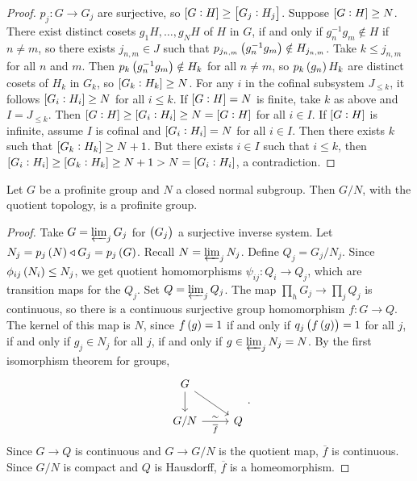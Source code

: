 \begin{proof}
$ p_j : G \to G_j $ are surjective, so $ \sbr{G : H} \ge \sbr{G_j : H_j} $. Suppose $ \sbr{G : H} \ge N $. There exist distinct cosets $ g_1H, \dots, g_NH $ of $ H $ in $ G $, if and only if $ g_n^{-1}g_m \notin H $ if $ n \ne m $, so there exists $ j_{n, m} \in J $ such that $ p_{j_{n, m}}\br{g_n^{-1}g_m} \notin H_{j_{n, m}} $. Take $ k \le j_{n, m} $ for all $ n $ and $ m $. Then $ p_k\br{g_n^{-1}g_m} \notin H_k $ for all $ n \ne m $, so $ p_k\br{g_n}H_k $ are distinct cosets of $ H_k $ in $ G_k $, so $ \sbr{G_k : H_k} \ge N $. For any $ i $ in the cofinal subsystem $ J_{\le k} $, it follows $ \sbr{G_i : H_i} \ge N $ for all $ i \le k $. If $ \sbr{G : H} = N $ is finite, take $ k $ as above and $ I = J_{\le k} $. Then $ \sbr{G : H} \ge \sbr{G_i : H_i} \ge N = \sbr{G : H} $ for all $ i \in I $. If $ \sbr{G : H} $ is infinite, assume $ I $ is cofinal and $ \sbr{G_i : H_i} = N $ for all $ i \in I $. Then there exists $ k $ such that $ \sbr{G_k : H_k} \ge N + 1 $. But there exists $ i \in I $ such that $ i \le k $, then $ \sbr{G_i : H_i} \ge \sbr{G_k : H_k} \ge N + 1 > N = \sbr{G_i : H_i} $, a contradiction.
\end{proof}

\begin{proposition}
Let $ G $ be a profinite group and $ N $ a closed normal subgroup. Then $ G / N $, with the quotient topology, is a profinite group.
\end{proposition}

\begin{proof}
Take $ G = \varprojlim_j G_j $ for $ \br{G_j} $ a surjective inverse system. Let $ N_j = p_j\br{N} \triangleleft G_j = p_j\br{G} $. Recall $ N = \varprojlim_j N_j $. Define $ Q_j = G_j / N_j $. Since $ \phi_{ij}\br{N_i} \le N_j $, we get quotient homomorphisms $ \psi_{ij} : Q_i \to Q_j $, which are transition maps for the $ Q_j $. Set $ Q = \varprojlim_j Q_j $. The map $ \prod_h G_j \to \prod_j Q_j $ is continuous, so there is a continuous surjective group homomorphism $ f : G \to Q $. The kernel of this map is $ N $, since $ f\br{g} = 1 $ if and only if $ q_j\br{f\br{g}} = 1 $ for all $ j $, if and only if $ g_j \in N_j $ for all $ j $, if and only if $ g \in \varprojlim_j N_j = N $. By the first isomorphism theorem for groups,
$$
\begin{tikzcd}
G \arrow{d} \arrow{dr} & \\
G / N \arrow{r}{\sim}[swap]{\overline{f}} & Q
\end{tikzcd}.
$$
Since $ G \to Q $ is continuous and $ G \to G / N $ is the quotient map, $ \overline{f} $ is continuous. Since $ G / N $ is compact and $ Q $ is Hausdorff, $ \overline{f} $ is a homeomorphism.
\end{proof}


